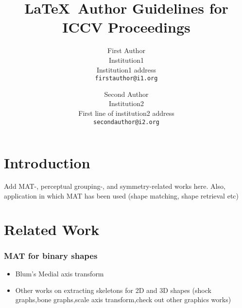 \documentclass[10pt,twocolumn,letterpaper]{article}
\begin{document}
\title{\LaTeX\ Author Guidelines for ICCV Proceedings}

\author{First Author\\
Institution1\\
Institution1 address\\
{\tt\small firstauthor@i1.org}
\and
Second Author\\
Institution2\\
First line of institution2 address\\
{\tt\small secondauthor@i2.org}
}

\maketitle


\begin{abstract}
\end{abstract}

\section{Introduction}\label{sec:introduction}
Add MAT-, perceptual grouping-, and symmetry-related works here.
Also, application in which MAT has been used (shape matching, shape retrieval etc)

\section{Related Work}\label{sec:related}
\subsubsection*{MAT for binary shapes}
\begin{itemize}
\item Blum's Medial axis transform
\item Other works on extracting skeletons for 2D and 3D shapes (shock graphs,bone graphs,scale axis transform,check out other graphics works)
\end{itemize}
\end{document}
